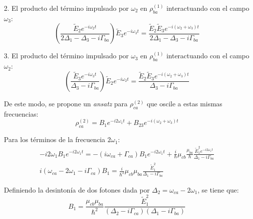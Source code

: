\documentclass[12pt,a4paper]{article}
\begin{document}
2. El producto del término impulsado por $\omega_2$ en $\rho_{ba}^{(1)}$ interactuando con el campo $\omega_3$:
\begin{equation}
\left( \frac{\tilde{E}_2 e^{-i\omega_2 t}}{2\Delta_1 - \Delta_3 - i\Gamma_{ba}} \right) \tilde{E}_3 e^{-i\omega_3 t} = \frac{\tilde{E}_2 \tilde{E}_3 e^{-i(\omega_2+\omega_3)t}}{2\Delta_1 - \Delta_3 - i\Gamma_{ba}}
\end{equation}

3. El producto del término impulsado por $\omega_3$ en $\rho_{ba}^{(1)}$ interactuando con el campo $\omega_2$:
\begin{equation}
\left( \frac{\tilde{E}_3 e^{-i\omega_3 t}}{\Delta_3 - i\Gamma_{ba}} \right) \tilde{E}_2 e^{-i\omega_2 t} = \frac{\tilde{E}_2 \tilde{E}_3 e^{-i(\omega_2+\omega_3)t}}{\Delta_3 - i\Gamma_{ba}}
\end{equation}

De este modo, se propone un \textit{ansatz} para $\rho_{ca}^{(2)}$ que oscile a estas mismas frecuencias:
\begin{equation}
\rho_{ca}^{(2)} = B_1 e^{-i2\omega_1 t} + B_{23} e^{-i(\omega_2+\omega_3)t}
\end{equation}

Para los términos de la frecuencia $2\omega_1$:
\begin{align}
-i2\omega_1 B_1 e^{-i2\omega_1 t} = -(i\omega_{ca} + \Gamma_{ca}) B_1 e^{-i2\omega_1 t} + \frac{i}{\hbar} \mu_{cb} \frac{\mu_{ba}}{\hbar} \frac{\tilde{E}_1^2 e^{-i2\omega_1 t}}{\Delta_1 - i\Gamma_{ba}}\\
i(\omega_{ca} - 2\omega_1 - i\Gamma_{ca}) B_1 = \frac{i}{\hbar^2} \mu_{cb} \mu_{ba} \frac{\tilde{E}_1^2}{\Delta_1 - i\Gamma_{ba}}
\end{align}


Definiendo la desintonía de dos fotones dada por $\Delta_2 = \omega_{ca} - 2\omega_1$, se tiene que: 
\begin{equation}
B_1 = \frac{\mu_{cb} \mu_{ba}}{\hbar^2} \frac{\tilde{E}_1^2}{(\Delta_2 - i\Gamma_{ca})(\Delta_1 - i\Gamma_{ba})}
\end{equation}
\end{document}
